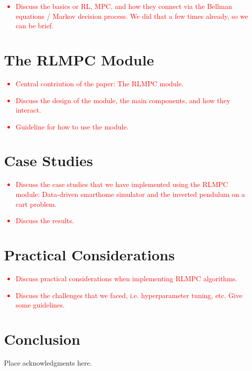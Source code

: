 \documentclass{ifacconf}
\begin{document}
\textcolor{red}{
   \begin{itemize}
      \item Discuss the basics or RL, MPC, and how they connect via the Bellman equations / Markov decision process. We did that a few times already, so we can be brief.
   \end{itemize}
}

\section{The RLMPC Module}

\textcolor{red}{
   \begin{itemize}
      \item Central contriution of the paper: The RLMPC module.
      \item Discuss the design of the module, the main components, and how they interact.
      \item Guideline for how to use the module.
   \end{itemize}
}

\section{Case Studies}

\textcolor{red}{
   \begin{itemize}
      \item Discuss the case studies that we have implemented using the RLMPC module: Data-driven smarthome simulator and the inverted pendulum on a cart problem.
      \item Discuss the results.
   \end{itemize}
}

\section{Practical Considerations}

\textcolor{red}{
   \begin{itemize}
      \item Discuss practical considerations when implementing RLMPC algorithms.
      \item Discuss the challenges that we faced, i.e. hyperparameter tuning, etc. Give some guidelines.
   \end{itemize}
}

\section{Conclusion}

\begin{ack}
   Place acknowledgments here.
\end{ack}


\end{document}
